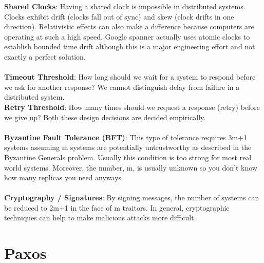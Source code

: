 \documentclass[twoside]{article}
\begin{document}
\textbf{Shared Clocks}: Having a shared clock is impossible in distributed systems.  Clocks exhibit drift (clocks fall out of sync) and skew (clock drifts in one direction).  Relativistic effects can also make a difference because computers are operating at such a high speed.  Google spanner actually uses atomic clocks to establish bounded time drift although this is a major engineering effort and not exactly a perfect solution.\\
\\
\textbf{Timeout Threshold}: How long should we wait for a system to respond before we ask for another response?  We cannot distinguish delay from failure in a distributed system.\\
\textbf{Retry Threshold}: How many times should we request a response (retry) before we give up?  Both these design decisions are decided empirically.\\
\\
\textbf{Byzantine Fault Tolerance (BFT)}: This type of tolerance requires 3m+1 systems assuming m systems are potentially untrustworthy as described in the Byzantine Generals problem.  Usually this condition is too strong for most real world systems.  Moreover, the number, m, is usually unknown so you don't know how many replicas you need anyways.\\
\\
\textbf{Cryptography / Signatures}: By signing messages, the number of systems can be reduced to 2m+1 in the face of m traitors.  In general, cryptographic techniques can help to make malicious attacks more difficult.

\section{Paxos}
\end{document}
